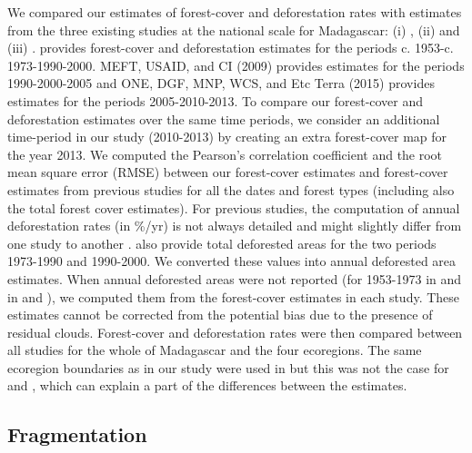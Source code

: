 \documentclass[essd, classical]{copernicus}
\begin{document}
We compared our estimates of forest-cover and deforestation rates with
estimates from the three existing studies at the national scale for
Madagascar: (i) \citep{Harper2007}, (ii) \citep{MEFT2009} and (iii)
\citep{ONE2015}. \citet{Harper2007} provides forest-cover and
deforestation estimates for the periods
c. 1953-c. 1973-1990-2000. MEFT, USAID, and CI (2009) provides
estimates for the periods 1990-2000-2005 and ONE, DGF, MNP, WCS, and
Etc Terra (2015) provides estimates for the periods 2005-2010-2013. To
compare our forest-cover and deforestation estimates over the same
time periods, we consider an additional time-period in our study
(2010-2013) by creating an extra forest-cover map for the year
2013. We computed the Pearson's correlation coefficient and the root
mean square error (RMSE) between our forest-cover estimates and
forest-cover estimates from previous studies for all the dates and
forest types (including also the total forest cover estimates). For
previous studies, the computation of annual deforestation rates (in
\%/yr) is not always detailed and might slightly differ from one study
to another \citep[see][]{Puyravaud2003}. \citet{Harper2007} also
provide total deforested areas for the two periods 1973-1990 and
1990-2000. We converted these values into annual deforested area
estimates. When annual deforested areas were not reported (for
1953-1973 in \citet{Harper2007} and in \citet{MEFT2009} and
\citet{ONE2015}), we computed them from the forest-cover estimates in
each study. These estimates cannot be corrected from the potential
bias due to the presence of residual clouds. Forest-cover and
deforestation rates were then compared between all studies for the
whole of Madagascar and the four ecoregions. The same ecoregion
boundaries as in our study were used in \citet{ONE2015} but this was
not the case for \citet{Harper2007} and \citet{MEFT2009}, which can
explain a part of the differences between the estimates.

\subsection{Fragmentation}
\end{document}
